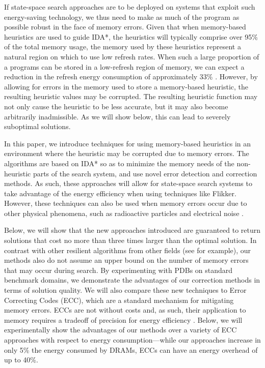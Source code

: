 If state-space search approaches are to be deployed on systems that exploit such energy-saving technology, we thus need to make as much of the program as possible robust in the face of memory errors. Given that when memory-based heuristics are used to guide IDA*, the heuristics will typically comprise over 95\% of the total memory usage, the memory used by these heuristics represent a natural region on which to use low refresh rates. When such a large proportion of a programs can be stored in a low-refresh region of memory, we can expect a reduction in the refresh energy consumption of approximately 33\% \cite{Liu:2011:FSD:1950365.1950391}. However, by allowing for errors in the memory used to store a memory-based heuristic, the resulting heuristic values may be corrupted. The resulting heuristic function may not only cause the heuristic to be less accurate, but it may also become arbitrarily inadmissible. As we will show below, this can lead to severely suboptimal solutions.

In this paper, we introduce techniques for using memory-based heuristics in an environment where the heuristic may be corrupted due to memory errors. The algorithms are based on IDA* so as to minimize the memory needs of the non-heuristic parts of the search system, and use novel error detection and correction methods. As such, these approaches will allow for state-space search systems to take advantage of the energy efficiency when using techniques like Flikker. However, these techniques can also be used when memory errors occur due to other physical phenomena, such as radioactive particles and electrical noise \cite{7266869}.

Below, we will show that the new approaches introduced are guaranteed to return solutions that cost no more than three times larger than the optimal solution. In contrast with other resilient algorithms from other fields (see \cite{finocchi2007designing} for example), our methods also do not assume an upper bound on the number of memory errors that may occur during search. By experimenting with PDBs on standard benchmark domains, we demonstrate the advantages of our correction methods in terms of solution quality. We will also compare these new techniques to Error Correcting Codes (ECC), which are a standard mechanism for mitigating memory errors. ECCs are not without costs and, as such, their application to memory requires a tradeoff of precision for energy efficiency \cite{Luo:2014:CAM:2671853.2672438}. Below, we will experimentally show the advantages of our methods over a variety of ECC approaches with respect to energy consumption---while our approaches increase in only 5\% the energy consumed by DRAMs, ECCs can have an energy overhead of up to 40\%. 




